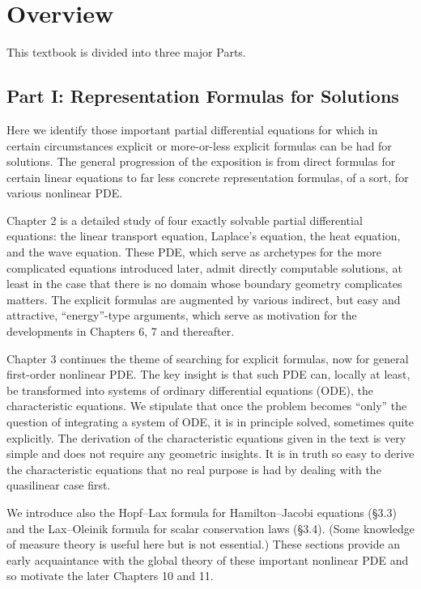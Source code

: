 \section{Overview}
\label{sec:1-4}

This textbook is divided into three major Parts.

\subsection*{Part I: Representation Formulas for Solutions} Here we identify those important partial differential equations for which in certain circumstances explicit or more-or-less explicit formulas can be had for solutions. The general progression of the exposition is from direct formulas for certain linear equations to far less concrete representation formulas, of a sort, for various nonlinear PDE.

Chapter 2 is a detailed study of four exactly solvable partial differential equations: the linear transport equation, Laplace's equation, the heat equation, and the wave equation. These PDE, which serve as archetypes for the more complicated equations introduced later, admit directly computable solutions, at least in the case that there is no domain whose boundary geometry complicates matters. The explicit formulas are augmented by various indirect, but easy and attractive, ``energy''-type arguments, which serve as motivation for the developments in Chapters 6, 7 and thereafter.

Chapter 3 continues the theme of searching for explicit formulas, now for general first-order nonlinear PDE. The key insight is that such PDE can, locally at least, be transformed into systems of ordinary differential equations (ODE), the characteristic equations. We stipulate that once the problem becomes ``only'' the question of integrating a system of ODE, it is in principle solved, sometimes quite explicitly. The derivation of the characteristic equations given in the text is very simple and does not require any geometric insights. It is in truth so easy to derive the characteristic equations that no real purpose is had by dealing with the quasilinear case first.

We introduce also the Hopf--Lax formula for Hamilton--Jacobi equations (\S3.3) and the Lax--Oleinik formula for scalar conservation laws (\S3.4). (Some knowledge of measure theory is useful here but is not essential.) These sections provide an early acquaintance with the global theory of these important nonlinear PDE and so motivate the later Chapters 10 and 11. \par\Needspace{65mm}

